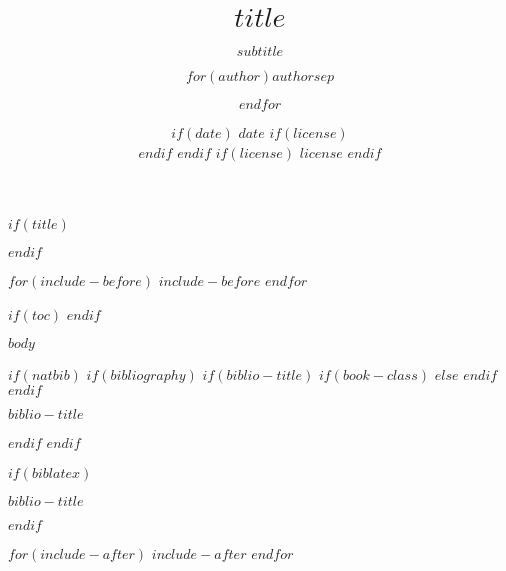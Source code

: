 \documentclass[$if(fontsize)$$fontsize$,$else$10pt,$endif$$if(lang)$$babel-lang$,$endif$$if(handout)$handout,$endif$$if(colorlinks)$dvipsnames,$endif$$if(beamer)$ignorenonframetext,$endif$$for(classoption)$$classoption$$sep$,$endfor$]{$documentclass$}
\title[$shorttitle$]{$title$}
\subtitle{$subtitle$}
\author[
    $if(short-author)$
    $for(short-author)$$short-author$$sep$ \and $endfor$
  $else$
    $for(author)$$author$$sep$ \and $endfor$
  $endif$
  ]{$for(author)$$author$$sep$ \and $endfor$}
\institute[
  $if(short-institute)$
    $for(short-institute)$$short-institute$$sep$ \and $endfor$
  $endif$
  ]{
  $if(department)$
    $for(department)$$department$$sep$ \and $endfor$ \\
  $endif$
  $for(institute)$$institute$$sep$ \and $endfor$
  $if(email)$
    \\ $for(email)$ \href{mailto:$email$}{\nolinkurl{$email$}}$sep$ \and $endfor$
  $endif$
  }
\date[
  $if(short-date)$
    $short-date$
  $else$
    $date$
  $endif$]{
  $if(date)$
    $date$
    $if(license)$
      \\ \vspace{5mm}
    $endif$
  $endif$
  $if(license)$
    {\scriptsize $license$}
  $endif$
}
\newif\ifbibliography
\begin{document}
$if(title)$
  \begin{frame}[plain]
  \titlepage
  \end{frame}
$endif$

$for(include-before)$
  $include-before$
$endfor$

$if(toc)$
$endif$

$body$

$if(natbib)$
  $if(bibliography)$
    $if(biblio-title)$
      $if(book-class)$
        \renewcommand\bibname{$biblio-title$}
        $else$
        \renewcommand\refname{$biblio-title$}
      $endif$
    $endif$
    \begin{frame}[allowframebreaks]{$biblio-title$}
    \bibliographytrue
    
    \end{frame}
  $endif$
$endif$

$if(biblatex)$
  \begin{frame}[allowframebreaks]{$biblio-title$}
  \bibliographytrue
  \printbibliography[heading=none]
  \end{frame}
$endif$

$for(include-after)$
  $include-after$
$endfor$
\end{document}
